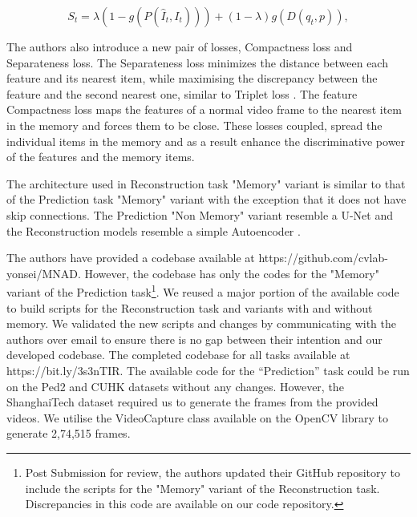 \begin{equation}
    \label{eqn:abnorm}
     S_{t} = \lambda \left ( 1 - g\left ( P\left ( \hat{I}_{t},I_{t} \right ) \right ) \right ) + \left ( 1 - \lambda \right )g\left ( D\left ( q_{t},p \right ) \right ),
 \end{equation}

The authors also introduce a new pair of losses, Compactness loss and Separateness loss. The Separateness loss minimizes the distance between each feature and its nearest item, while maximising the discrepancy between the feature and the second nearest one, similar to Triplet loss \cite{Weinberger06distancemetric}. The feature Compactness loss maps the features of a normal video frame to the nearest item in the memory and forces them to be close. These losses coupled, spread the individual items in the memory and as a result enhance the discriminative power of the features and the memory items. 

The architecture used in Reconstruction task "Memory" variant is similar to that of the Prediction task "Memory" variant with the exception that it does not have skip connections. The Prediction "Non Memory" variant resemble a U-Net \cite{ronneberger2015unet} and the Reconstruction models resemble a simple Autoencoder \cite{kingma2014autoencoding}. 

The authors have provided a codebase available at https://github.com/cvlab-yonsei/MNAD. However, the codebase has only the codes for the "Memory" variant of the Prediction task\footnote{Post Submission for review, the authors updated their GitHub repository to include the scripts for the "Memory" variant of the Reconstruction task. Discrepancies in this code are available on our code repository.}. We reused a major portion of the available code to build scripts for the Reconstruction task and variants with and without memory. We validated the new scripts and changes by communicating with the authors over email to ensure there is no gap between their intention and our developed codebase. The completed codebase for all tasks available at https://bit.ly/3s3nTIR. The available code for the “Prediction” task could be run on the Ped2\cite{6739466} and CUHK\cite{6751449} datasets without any changes. However, the ShanghaiTech dataset\cite{Luo2017ARO} required us to generate the frames from the provided videos. We utilise the VideoCapture class available on the OpenCV library to generate 2,74,515 frames.

